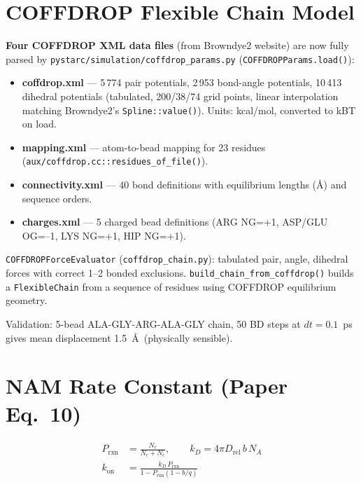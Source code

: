 \documentclass[12pt,a4paper]{article}
\newcommand{\kon}{k_{\mathrm{on}}}
\newcommand{\OK}{\textcolor{cgreen}{\checkmark}}
\begin{document}
\section{COFFDROP Flexible Chain Model}

\begin{samebox}
\textbf{Four COFFDROP XML data files} (from Browndye2 website) are now fully
parsed by \texttt{pystarc/simulation/coffdrop\_params.py}
(\texttt{COFFDROPParams.load()}):

\begin{itemize}[nosep]
\item \textbf{coffdrop.xml} — 5\,774 pair potentials, 2\,953 bond-angle
  potentials, 10\,413 dihedral potentials (tabulated, 200/38/74 grid points,
  linear interpolation matching Browndye2's \texttt{Spline::value()}).
  Units: kcal/mol, converted to kBT on load.
\item \textbf{mapping.xml} — atom-to-bead mapping for 23 residues
  (\texttt{aux/coffdrop.cc::residues\_of\_file()}).
\item \textbf{connectivity.xml} — 40 bond definitions with equilibrium
  lengths (Å) and sequence orders.
\item \textbf{charges.xml} — 5 charged bead definitions (ARG NG=+1,
  ASP/GLU OG=--1, LYS NG=+1, HIP NG=+1).
\end{itemize}

\texttt{COFFDROPForceEvaluator} (\texttt{coffdrop\_chain.py}):
tabulated pair, angle, dihedral forces with correct 1--2 bonded exclusions.
\texttt{build\_chain\_from\_coffdrop()} builds a \texttt{FlexibleChain}
from a sequence of residues using COFFDROP equilibrium geometry.

Validation: 5-bead ALA-GLY-ARG-ALA-GLY chain, 50 BD steps at $dt=0.1$~ps
gives mean displacement 1.5~\AA\ (physically sensible). \OK
\end{samebox}

\section{NAM Rate Constant (Paper Eq.~10)}

\begin{align}
P_\mathrm{rxn} &= \frac{N_r}{N_r+N_e}, \qquad
k_D = 4\pi D_\mathrm{rel}\,b\,N_A \\
\kon &= \frac{k_D\,P_\mathrm{rxn}}{1-P_\mathrm{rxn}(1-b/q)}
\end{align}
\end{document}
